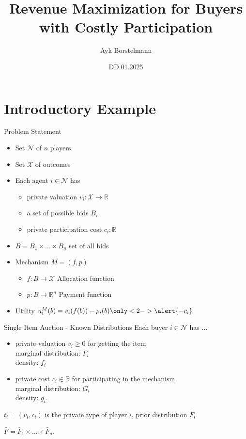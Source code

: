 \documentclass{beamer}
\title{Revenue Maximization for Buyers with Costly Participation}
\date{DD.01.2025}
\author{Ayk Borstelmann}
\institute{
    Seminar Algorithmic Game Theory
}
\begin{document}
\maketitle
\section{Introductory Example}
\begin{frame}{Problem Statement}
  \begin{itemize}
    \item Set $\mathcal{N}$ of $n$ players
    \item Set $\mathcal{X}$ of outcomes
    \item Each agent $i \in \mathcal{N}$ has
          \begin{itemize}
            \item private valuation $v_i: \mathcal{X} \rightarrow \mathbb{R}$
            \item a set of possible bids $B_i$
            \item<2-> \alert{private participation cost $c_i: \mathbb{R}$}
          \end{itemize}
    \item $B = B_1 \times \dots \times B_n$ set of all bids
    \item Mechanism $M = (f,p)$
          \begin{itemize}
            \item $f: B \rightarrow \mathcal{X}$ Allocation function
            \item $p: B \rightarrow \mathbb{R}^n$ Payment function
          \end{itemize}
    \item Utility $u_i^M(b) = v_i(f(b)) - p_i(b) \only<2->{\alert{-c_i}}$
  \end{itemize}
\end{frame}
\begin{frame}{Single Item Auction - Known Distributions}
  Each buyer $i \in \mathcal{N}$ has ...
  \begin{itemize}
    \item private valuation $v_i \geq 0$ for getting the item\\
    marginal distribution: $F_i$\\
    density: $f_i$
    \item private cost $c_i \in \mathbb{R}$ for participating in the mechanism \\
    marginal distribution: $G_i$ \\
    density: $g_i$.
  \end{itemize}
  $t_i = (v_i, c_i)$ is the private type of player $i$, prior distribution $\bar{F}_i$.

  $\bar{F} = \bar{F}_1 \times \dots \times \bar{F}_n$.
\end{frame}
\end{document}
